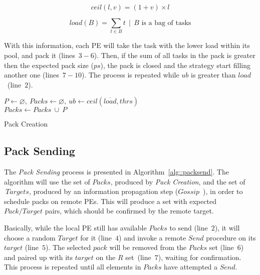 \begin{equation}
	ceil(l,v) = (1+v)\times l
    \label{eq:ceil}
\end{equation}

\begin{equation}
	load(B) = \sum_{t \in B}t\ \ |\ \ B \text{ is a bag of tasks}
	\label{eq:load}
\end{equation}

With this information, each PE will take the task with the lower load within its pool, and pack it (lines~$3-6$). %
Then, if the sum of all tasks in the pack is greater then the expected pack size ($ps$), the pack is closed and the strategy start filling another one (lines~$7-10$).
The process is repeated while $ub$ is greater than $load$~(line~$2$).

\begin{algorithm}[!ht]
    \DontPrintSemicolon
    $P \gets \varnothing,\ Packs \gets \varnothing,\ ub \gets ceil(\overline{load},thrs)$ \\
    $Packs \gets Packs\ \cup\ P$   
    \caption{Pack Creation} 
    \label{alg::packcreation}
\end{algorithm}

\subsection{Pack Sending}

The \textit{Pack Sending} process is presented in Algorithm~\ref{alg::packsend}.
The algorithm will use the set of $Packs$, produced by \textit{Pack Creation}, and the set of $\ Targets$, produced by an information propagation step ($Gossip$~\cite{gossip}), in order to schedule packs on remote PEs.
This will produce a set with expected $Pack/Target$ pairs, which should be confirmed by the remote target.

Basically, while the local PE still has available $Packs$ to send (line~$2$), it will choose a random $Target$ for it (line~$4$) and invoke a remote $Send$ procedure on its $target$ (line~$5$).
The selected $pack$ will be removed from the $Packs$ set (line~$6$) and paired up with its $target$ on the $R$ set~(line~$7$), waiting for confirmation.
This process is repeated until all elements in $Packs$ have attempted a $Send$.

